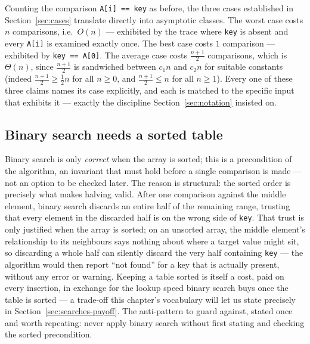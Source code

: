 \documentclass[11pt]{article}
\begin{document}
Counting the comparison \texttt{A[i] == key} as before, the three cases
established in Section~\ref{sec:cases} translate directly into asymptotic
classes. The worst case costs $n$ comparisons, i.e.\ $O(n)$ --- exhibited by
the trace where \texttt{key} is absent and every \texttt{A[i]} is examined
exactly once. The best case costs $1$ comparison --- exhibited by
\texttt{key == A[0]}. The average case costs $\frac{n+1}{2}$ comparisons,
which is $\Theta(n)$, since $\frac{n+1}{2}$ is sandwiched between $c_1 n$
and $c_2 n$ for suitable constants (indeed $\frac{n+1}{2} \geq \frac{1}{2}n$
for all $n \geq 0$, and $\frac{n+1}{2} \leq n$ for all $n \geq 1$). Every one
of these three claims names its case explicitly, and each is matched to the
specific input that exhibits it --- exactly the discipline
Section~\ref{sec:notation} insisted on.

\subsection{Binary search needs a sorted table}

Binary search is only \emph{correct} when the array is sorted; this is a
precondition of the algorithm, an invariant that must hold before a single
comparison is made --- not an option to be checked later. The reason is
structural: the sorted order is precisely what makes halving valid. After
one comparison against the middle element, binary search discards an entire
half of the remaining range, trusting that every element in the discarded
half is on the wrong side of \texttt{key}. That trust is only justified when
the array is sorted; on an unsorted array, the middle element's relationship
to its neighbours says nothing about where a target value might sit, so
discarding a whole half can silently discard the very half containing
\texttt{key} --- the algorithm would then report ``not found'' for a key
that is actually present, without any error or warning. Keeping a table
sorted is itself a cost, paid on every insertion, in exchange for the
lookup speed binary search buys once the table is sorted --- a trade-off
this chapter's vocabulary will let us state precisely in
Section~\ref{sec:searches-payoff}. The anti-pattern to guard against, stated
once and worth repeating: never apply binary search without first stating
and checking the sorted precondition.
\end{document}
